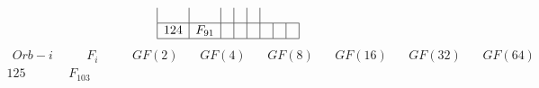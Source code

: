 \documentclass{article}
\begin{document}
{$$\begin{array}{|r|*{7}{r|}}
 & 
 & 
 & 
 & 
\\
\hline
124 
 & F_{91} &
 & 
 & 
 & 
 & 
 & 
\\
\hline
\end{array}
$$
$$
\begin{array}{|r|*{7}{r|}}
\hline
\ \ Orb-i \ \ &\ \ \quad F_i \quad \ \  &\ \ GF(2)\ \ &\ \ GF(4)\ \ &\ \ GF(8)\ \ &\ \ GF(16)\ \ &\ \ GF(32)\ \ &\ \ GF(64)\ \ \\
\hline
125 
 & F_{103} &
 & 
 & 
 & 

\end{array}$$}
\end{document}
